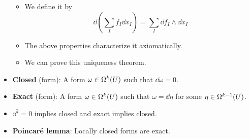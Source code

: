 \documentclass[../notes.tex]{subfiles}
\begin{document}
\begin{itemize}
    \begin{itemize}
        \item We define it by
        \begin{equation*}
            \dd{\left( \sum_If_I\dd{x_I} \right)} = \sum_I\dd{f_I}\wedge\dd{x_I}
        \end{equation*}
        \item The above properties characterize it axiomatically.
        \item We can prove this uniqueness theorem.
    \end{itemize}
    \item \textbf{Closed} (form): A form $\omega\in\ome[k]{U}$ such that $\dd{\omega}=0$.
    \item \textbf{Exact} (form): A form $\omega\in\ome[k]{U}$ such that $\omega=\dd{\eta}$ for some $\eta\in\ome[k-1]{U}$.
    \item $\dd^2=0$ implies closed and exact implies closed.
    \item \textbf{Poincar\'{e} lemma}: Locally closed forms are exact.
\end{itemize}
\end{document}
